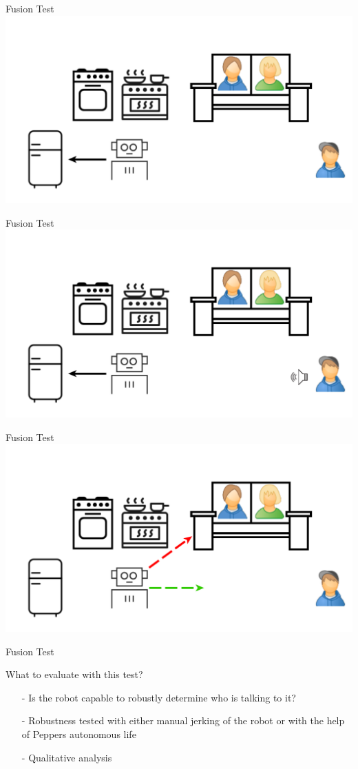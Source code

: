 \documentclass{beamer}
\begin{document}
	\begin{frame}{Fusion Test}
		\centering
		\includegraphics[width=.75\textwidth]{Bilder/fusion_test_0}
	\end{frame}
	
	\begin{frame}{Fusion Test}
		\centering
		\includegraphics[width=.75\textwidth]{Bilder/fusion_test_1}
	\end{frame}
	
	\begin{frame}{Fusion Test}
		\centering
		\includegraphics[width=.75\textwidth]{Bilder/fusion_test_2}
	\end{frame}
	
	\begin{frame}{Fusion Test}
		\begin{alertblock}{What to evaluate with this test?}
			\pause
			\begin{itemize}
				\item[-] Is the robot capable to robustly determine who is talking to it?
				\item[-] Robustness tested with either manual jerking of the robot or with the help of Peppers autonomous life
				\item[-] Qualitative analysis 
			\end{itemize}
		\end{alertblock}
	\end{frame}
	
\end{document}
